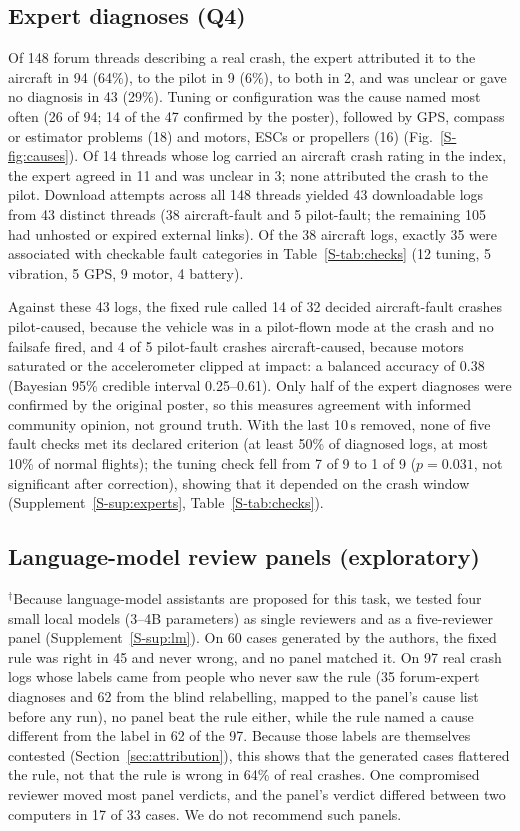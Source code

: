 \documentclass[preprint,12pt]{elsarticle}
\begin{document}
\FloatBarrier
\subsection{Expert diagnoses (Q4)}
\label{sec:experts}
Of 148 forum threads describing a real crash, the expert attributed it to the aircraft in 94 (64\%), to the pilot in 9
(6\%), to both in 2, and was unclear or gave no diagnosis in 43 (29\%). Tuning or configuration was the cause named
most often (26 of 94; 14 of the 47 confirmed by the poster), followed by GPS, compass or estimator problems (18) and
motors, ESCs or propellers (16) (Fig.~\ref{S-fig:causes}). Of 14 threads whose log carried an aircraft crash rating in the index, the
expert agreed in 11 and was unclear in 3; none attributed the crash to the pilot. Download attempts across all 148 threads
yielded 43 downloadable logs from 43 distinct threads (38 aircraft-fault and 5 pilot-fault; the remaining 105 had unhosted
or expired external links). Of the 38 aircraft logs, exactly 35 were associated with checkable fault categories in
Table~\ref{S-tab:checks} (12 tuning, 5 vibration, 5 GPS, 9 motor, 4 battery).

Against these 43 logs, the fixed rule called 14 of 32 decided aircraft-fault crashes pilot-caused, because the vehicle was in a pilot-flown mode at the crash and no failsafe fired, and 4 of 5 pilot-fault crashes aircraft-caused, because motors saturated or the accelerometer clipped at impact: a balanced accuracy of 0.38 (Bayesian 95\% credible interval 0.25--0.61). Only half of the expert diagnoses were confirmed by the original poster, so this measures agreement with informed community opinion, not ground truth. With the last 10\,s removed, none of five fault checks met its declared criterion (at least 50\% of diagnosed logs, at most 10\% of normal flights); the tuning check fell from 7 of 9 to 1 of 9 ($p=0.031$, not significant after correction), showing that it depended on the crash window (Supplement~\ref{S-sup:experts}, Table~\ref{S-tab:checks}).

\FloatBarrier
\subsection{Language-model review panels (exploratory)}
\label{sec:lm_summary}
$^\dagger$Because language-model assistants are proposed for this task, we tested four small local models (3--4B parameters) as single reviewers and as a five-reviewer panel (Supplement~\ref{S-sup:lm}). On 60 cases generated by the authors, the fixed rule was right in 45 and never wrong, and no panel matched it. On 97 real crash logs whose labels came from people who never saw the rule (35 forum-expert diagnoses and 62 from the blind relabelling, mapped to the panel's cause list before any run), no panel beat the rule either, while the rule named a cause different from the label in 62 of the 97. Because those labels are themselves contested (Section~\ref{sec:attribution}), this shows that the generated cases flattered the rule, not that the rule is wrong in 64\% of real crashes. One compromised reviewer moved most panel verdicts, and the panel's verdict differed between two computers in 17 of 33 cases. We do not recommend such panels.
\end{document}
